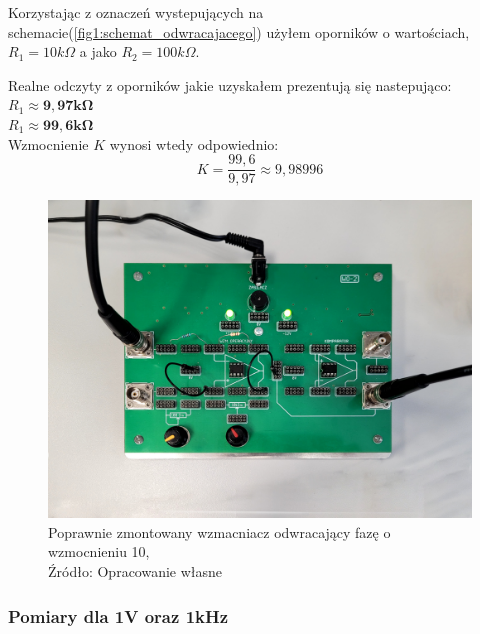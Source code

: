 \documentclass{article}
\begin{document}
        Korzystając z oznaczeń wystepujących na schemacie(\ref{fig1:schemat_odwracajacego}) użyłem oporników o wartościach, $R_1 = 10k \Omega$ a jako $R_2 = 100k \Omega$.

        Realne odczyty z oporników jakie uzyskałem prezentują się nastepująco: \\
        $R_1 \approx \mathbf{9,97k \Omega}$ \\
        $R_1 \approx \mathbf{99,6k \Omega}$ \\

        Wzmocnienie $K$ wynosi wtedy odpowiednio: \\

        \begin{equation}
          K = \frac{99,6}{9,97} \approx 9,98996
        \end{equation}

        \begin{figure}[!ht]
          \centering
          \includegraphics[scale=0.07]{grafiki/plytka_odwracajacy.jpg}
          \caption{Poprawnie zmontowany wzmacniacz odwracający fazę o wzmocnieniu 10,
          \\Źródło: Opracowanie własne}
        \end{figure}

      \subsubsection{Pomiary dla 1V oraz 1kHz}
\end{document}
